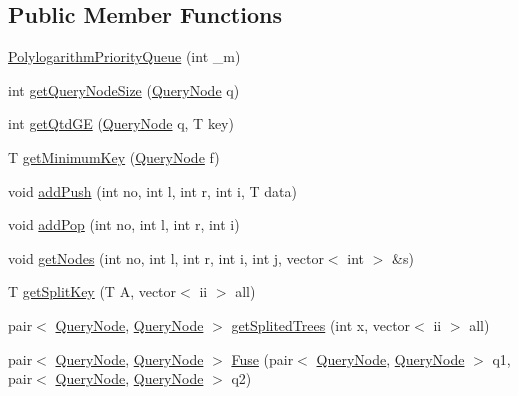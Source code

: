 \subsection*{Public Member Functions}
\begin{DoxyCompactItemize}
\item 
\hyperlink{classRetroactivity_1_1PolylogarithmPriorityQueue_ab925447d20c941a8f126d20c267052da}{Polylogarithm\+Priority\+Queue} (int \+\_\+m)
\item 
int \hyperlink{classRetroactivity_1_1PolylogarithmPriorityQueue_ade07f0238cb44def065cac46625b6f1f}{get\+Query\+Node\+Size} (\hyperlink{classRetroactivity_1_1PolylogarithmPriorityQueue_1_1QueryNode}{Query\+Node} q)
\item 
int \hyperlink{classRetroactivity_1_1PolylogarithmPriorityQueue_a4d118a35655e4bf4774a1fe1fdb0f884}{get\+Qtd\+GE} (\hyperlink{classRetroactivity_1_1PolylogarithmPriorityQueue_1_1QueryNode}{Query\+Node} q, T key)
\item 
T \hyperlink{classRetroactivity_1_1PolylogarithmPriorityQueue_a2ad9a9b51b4be420f0c5a65f6bcc3e41}{get\+Minimum\+Key} (\hyperlink{classRetroactivity_1_1PolylogarithmPriorityQueue_1_1QueryNode}{Query\+Node} f)
\item 
void \hyperlink{classRetroactivity_1_1PolylogarithmPriorityQueue_a87b978cc19aee60f21c55e2234e5730a}{add\+Push} (int no, int l, int r, int i, T data)
\item 
void \hyperlink{classRetroactivity_1_1PolylogarithmPriorityQueue_afc4926b8969ceb49e18eec4bcfedc054}{add\+Pop} (int no, int l, int r, int i)
\item 
void \hyperlink{classRetroactivity_1_1PolylogarithmPriorityQueue_a18cda73d1563529c27cf8533c7bcfde2}{get\+Nodes} (int no, int l, int r, int i, int j, vector$<$ int $>$ \&s)
\item 
T \hyperlink{classRetroactivity_1_1PolylogarithmPriorityQueue_a19a0f1350c94228d0a8d0e3bc8e6fd7f}{get\+Split\+Key} (T A, vector$<$ ii $>$ all)
\item 
pair$<$ \hyperlink{classRetroactivity_1_1PolylogarithmPriorityQueue_1_1QueryNode}{Query\+Node}, \hyperlink{classRetroactivity_1_1PolylogarithmPriorityQueue_1_1QueryNode}{Query\+Node} $>$ \hyperlink{classRetroactivity_1_1PolylogarithmPriorityQueue_acb5b4bb0403f953cae696fdd2db2e1e0}{get\+Splited\+Trees} (int x, vector$<$ ii $>$ all)
\item 
pair$<$ \hyperlink{classRetroactivity_1_1PolylogarithmPriorityQueue_1_1QueryNode}{Query\+Node}, \hyperlink{classRetroactivity_1_1PolylogarithmPriorityQueue_1_1QueryNode}{Query\+Node} $>$ \hyperlink{classRetroactivity_1_1PolylogarithmPriorityQueue_a4b505ade995caff1cdf8c037f492b067}{Fuse} (pair$<$ \hyperlink{classRetroactivity_1_1PolylogarithmPriorityQueue_1_1QueryNode}{Query\+Node}, \hyperlink{classRetroactivity_1_1PolylogarithmPriorityQueue_1_1QueryNode}{Query\+Node} $>$ q1, pair$<$ \hyperlink{classRetroactivity_1_1PolylogarithmPriorityQueue_1_1QueryNode}{Query\+Node}, \hyperlink{classRetroactivity_1_1PolylogarithmPriorityQueue_1_1QueryNode}{Query\+Node} $>$ q2)

\end{DoxyCompactItemize}
